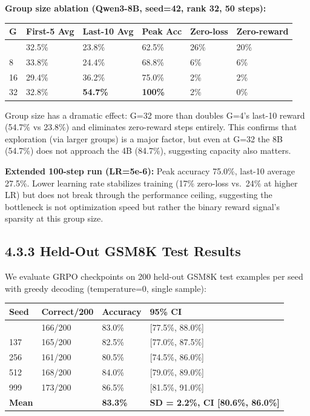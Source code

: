 \documentclass[
  american,
  11pt,
  a4paper,
  oneside]{report}
\newcounter{none} %
\begin{document}
\textbf{Group size ablation (Qwen3-8B, seed=42, rank 32, 50 steps):}

{\def\LTcaptype{none} %
\begin{longtable}[]{@{}llllll@{}}
\toprule\noalign{}
G & First-5 Avg & Last-10 Avg & Peak Acc & Zero-loss & Zero-reward \\
\midrule\noalign{}
\endhead
\bottomrule\noalign{}
\endlastfoot
4 & 32.5\% & 23.8\% & 62.5\% & 26\% & 20\% \\
8 & 33.8\% & 24.4\% & 68.8\% & 6\% & 6\% \\
16 & 29.4\% & 36.2\% & 75.0\% & 2\% & 2\% \\
32 & 32.8\% & \textbf{54.7\%} & \textbf{100\%} & 2\% & 0\% \\
\end{longtable}
}

Group size has a dramatic effect: G=32 more than doubles G=4's last-10
reward (54.7\% vs 23.8\%) and eliminates zero-reward steps entirely.
This confirms that exploration (via larger groups) is a major factor,
but even at G=32 the 8B (54.7\%) does not approach the 4B (84.7\%),
suggesting capacity also matters.

\textbf{Extended 100-step run (LR=5e-6):} Peak accuracy 75.0\%, last-10
average 27.5\%. Lower learning rate stabilizes training (17\% zero-loss
vs.~24\% at higher LR) but does not break through the performance
ceiling, suggesting the bottleneck is not optimization speed but rather
the binary reward signal's sparsity at this group size.

\subsection{4.3.3 Held-Out GSM8K Test
Results}\label{held-out-gsm8k-test-results}

We evaluate GRPO checkpoints on 200 held-out GSM8K test examples per
seed with greedy decoding (temperature=0, single sample):

{\def\LTcaptype{none} %
\begin{longtable}[]{@{}llll@{}}
\toprule\noalign{}
Seed & Correct/200 & Accuracy & 95\% CI \\
\midrule\noalign{}
\endhead
\bottomrule\noalign{}
\endlastfoot
42 & 166/200 & 83.0\% & {[}77.5\%, 88.0\%{]} \\
137 & 165/200 & 82.5\% & {[}77.0\%, 87.5\%{]} \\
256 & 161/200 & 80.5\% & {[}74.5\%, 86.0\%{]} \\
512 & 168/200 & 84.0\% & {[}79.0\%, 89.0\%{]} \\
999 & 173/200 & 86.5\% & {[}81.5\%, 91.0\%{]} \\
\textbf{Mean} & & \textbf{83.3\%} & \textbf{SD = 2.2\%, CI {[}80.6\%,
86.0\%{]}} \\
\end{longtable}
}
\end{document}
